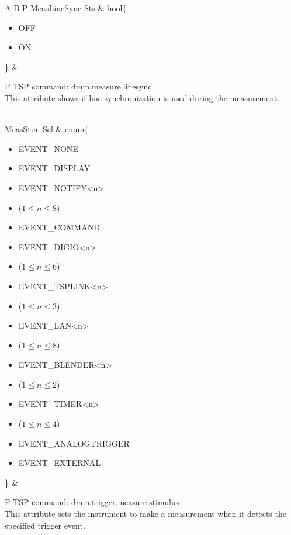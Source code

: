 \documentclass[openany]{article}
\begin{document}
\begin{longtable}{A B P}
		MeasLineSync-Sts & bool\{\begin{itemize}[noitemsep]
					\small
					\item[] OFF
					\item[] ON
				\end{itemize}\} & 
				\begin{tabular}{P}
					TSP command: dmm.measure.linesync \\
					This attribute shows if line synchronization is used during the measurement.
				\end{tabular} \\ \hline
		MeasStim-Sel & enum\{\begin{itemize}[noitemsep]
					\small
					\item[] EVENT\_NONE
					\item[] EVENT\_DISPLAY
					\item[] EVENT\_NOTIFY\textless n\textgreater
					\item[] ($1\leq n\leq 8$)
					\item[] EVENT\_COMMAND
					\item[] EVENT\_DIGIO\textless n\textgreater
					\item[] ($1\leq n\leq 6$)
					\item[] EVENT\_TSPLINK\textless n\textgreater
					\item[] ($1\leq n\leq 3$)
					\item[] EVENT\_LAN\textless n\textgreater
					\item[] ($1\leq n\leq 8$)
					\item[] EVENT\_BLENDER\textless n\textgreater 
					\item[] ($1\leq n\leq 2$)
					\item[] EVENT\_TIMER\textless n\textgreater
					\item[] ($1\leq n\leq 4$)
					\item[] EVENT\_ANALOGTRIGGER
					\item[] EVENT\_EXTERNAL
				\end{itemize}\} & 
				\begin{tabular}{P}
					TSP command: dmm.trigger.measure.stimulus \\
					This attribute sets the instrument to make a measurement when it detects the specified trigger event.
				\end{tabular} \\


\end{longtable}
\end{document}
